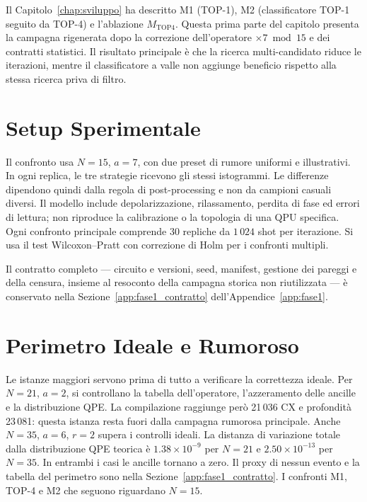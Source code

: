 \begin{onehalfspace}

Il Capitolo~\ref{chap:sviluppo} ha descritto M1 (TOP-1), M2
(classificatore TOP-1 seguito da TOP-4) e l'ablazione
$M_{\mathrm{TOP4}}$. Questa prima parte del capitolo presenta la campagna rigenerata
dopo la correzione dell'operatore $\times7\bmod15$ e dei contratti
statistici. Il risultato principale è che la ricerca multi-candidato
riduce le iterazioni, mentre il classificatore a valle non aggiunge
beneficio rispetto alla stessa ricerca priva di filtro.

\section{Setup Sperimentale}
\label{sec:setup_m1}
\label{sec:setup_m2}

Il confronto usa $N=15$, $a=7$, con due preset di rumore uniformi e illustrativi. In ogni replica, le tre strategie ricevono gli stessi istogrammi. Le differenze dipendono quindi dalla regola di post-processing e non da campioni casuali diversi. Il modello include depolarizzazione, rilassamento, perdita di fase ed errori di lettura; non riproduce la calibrazione o la topologia di una QPU specifica. Ogni confronto principale comprende 30 repliche da $1\,024$ shot per iterazione. Si usa il test Wilcoxon--Pratt con correzione di Holm per i confronti multipli.

Il contratto completo --- circuito e versioni, seed, manifest, gestione
dei pareggi e della censura, insieme al resoconto della campagna storica
non riutilizzata --- è conservato nella
Sezione~\ref{app:fase1_contratto} dell'Appendice~\ref{app:fase1}.

\section{Perimetro Ideale e Rumoroso}
\label{sec:circuito_m1}
\label{sec:scalabilita}

Le istanze maggiori servono prima di tutto a verificare la correttezza ideale. Per $N=21$, $a=2$, si controllano la tabella dell'operatore, l'azzeramento delle ancille e la distribuzione QPE. La compilazione raggiunge però 21\,036 CX e profondità 23\,081: questa istanza resta fuori dalla campagna rumorosa principale. Anche $N=35$, $a=6$, $r=2$ supera i controlli ideali. La distanza di variazione totale dalla distribuzione QPE teorica è $1.38\times10^{-9}$ per $N=21$ e $2.50\times10^{-13}$ per $N=35$. In entrambi i casi le ancille tornano a zero. Il proxy di nessun evento e la tabella del perimetro sono nella Sezione~\ref{app:fase1_contratto}. I confronti M1, TOP-4 e M2 che seguono riguardano $N=15$.


\end{onehalfspace}
